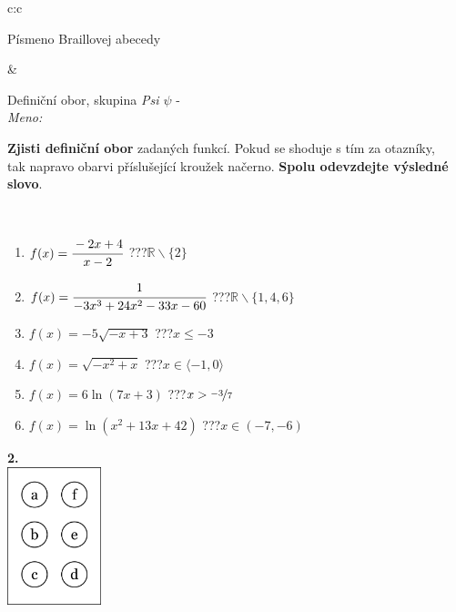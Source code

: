 \documentclass[10pt]{report}
\begin{document}
\begin{tabular}{c:c}
\begin{minipage}[c][104.5mm][t]{0.5\linewidth}
\begin{center}
\begin{minipage}{0.20\linewidth}
\begin{center}
{\small Písmeno Braillovej abecedy}
\end{center}
\end{minipage}
\end{center}
\end{minipage}
&
\begin{minipage}[c][104.5mm][t]{0.5\linewidth}
\begin{center}
\vspace{7mm}
{\huge Definiční obor, skupina \textit{Psi $\psi$} -}\\[5mm]
\textit{Meno:}\phantom{xxxxxxxxxxxxxxxxxxxxxxxxxxxxxxxxxxxxxxxxxxxxxxxxxxxxxxxxxxxxxxxxx}\\[5mm]
\begin{minipage}{0.95\linewidth}
\textbf{Zjisti definiční obor} zadaných funkcí. Pokud se shoduje s tím za otazníky,\\tak napravo obarvi příslušející kroužek načerno. \textbf{Spolu odevzdejte výsledné slovo}.
\end{minipage}
\\[1mm]
\begin{minipage}{0.79\linewidth}
\begin{center}
\begin{varwidth}{\linewidth}
\begin{enumerate}
\normalsizerrr
\item $f(x)=\cfrac{-2x+4}{x-2}$\quad \dotfill\; ???\;\dotfill \quad $\mathbb{R}\smallsetminus\{2\}$
\item $f(x)=\cfrac{1}{-3x^3+24x^2-33x-60}$\quad \dotfill\; ???\;\dotfill \quad $\mathbb{R}\smallsetminus\{1,4,6\}$
\item $f(x)=-5\sqrt{-x+3}$\quad \dotfill\; ???\;\dotfill \quad $x\leq-3$
\item $f(x)=\sqrt{-x^2+x}$\quad \dotfill\; ???\;\dotfill \quad $x\in\langle-1 , 0\rangle$
\item $f(x)=6\ln{(7x+3)}$\quad \dotfill\; ???\;\dotfill \quad $x>\nicefrac{-3}{7}$
\item $f(x)=\ln{(x^2+13x+42)}$\quad \dotfill\; ???\;\dotfill \quad $x\in(-7 , -6)$
\end{enumerate}
\end{varwidth}
\end{center}
\end{minipage}
\begin{minipage}{0.20\linewidth}
\begin{center}
{\Huge\bfseries 2.} \\[2mm]
\includegraphics[height=40mm]{../images/braille.png}

\end{center}
\end{minipage}
\end{center}
\end{minipage}
\end{tabular}
\end{document}
